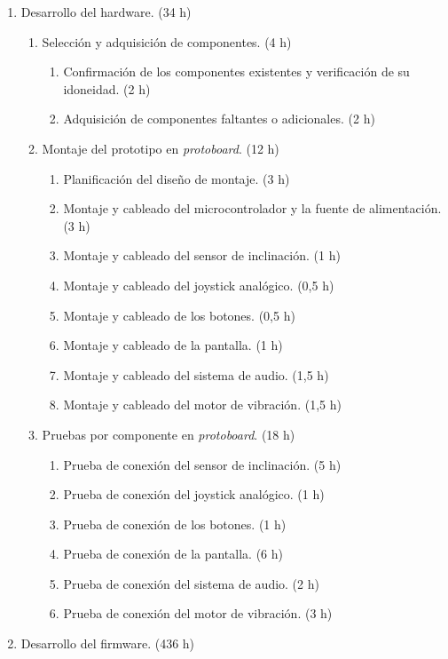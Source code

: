 \documentclass[
11pt, %
]{charter}
\begin{document}
\begin{enumerate}	
	\item	Desarrollo del hardware. (34 h)
	\begin{enumerate}	
	\item	Selección y adquisición de componentes. (4 h)
	\begin{enumerate}	
	\item	Confirmación de los componentes existentes y verificación de su idoneidad. (2 h)
	\item	Adquisición de componentes faltantes o adicionales. (2 h)
	\end{enumerate}	
	\item	Montaje del prototipo en \textit{protoboard}. (12 h)
	\begin{enumerate}	
	\item	Planificación del diseño de montaje. (3 h)
	\item	Montaje y cableado del microcontrolador y la fuente de alimentación. (3 h)
	\item	Montaje y cableado del sensor de inclinación. (1 h)
	\item	Montaje y cableado del joystick analógico. (0,5 h)
	\item	Montaje y cableado de los botones. (0,5 h)
	\item	Montaje y cableado de la pantalla. (1 h)
	\item	Montaje y cableado del sistema de audio. (1,5 h)
	\item	Montaje y cableado del motor de vibración. (1,5 h)
	\end{enumerate}	
	\item	Pruebas por componente en \textit{protoboard}. (18 h)
	\begin{enumerate}	
	\item	Prueba de conexión del sensor de inclinación. (5 h)
	\item	Prueba de conexión del joystick analógico. (1 h)
	\item	Prueba de conexión de los botones. (1 h)
	\item	Prueba de conexión de la pantalla. (6 h)
	\item	Prueba de conexión del sistema de audio. (2 h)
	\item	Prueba de conexión del motor de vibración. (3 h)
	\end{enumerate}	
	\end{enumerate}	
	\item	Desarrollo del firmware. (436 h)
	\begin{enumerate}	

\end{enumerate}
\end{enumerate}
\end{document}
